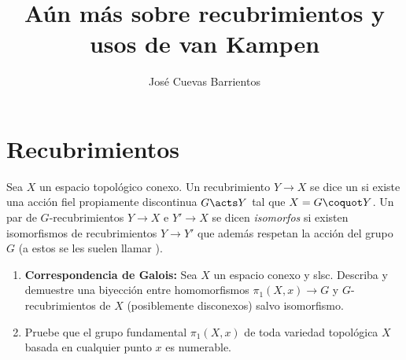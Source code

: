 \documentclass[11pt, reqno]{amsart}
\title{Aún más sobre recubrimientos y usos de van Kampen}
\date{\DTMdate{2026-10-29}}
\author{José Cuevas Barrientos}
\begin{document}
\maketitle

\section{Recubrimientos}
Sea $X$ un espacio topológico conexo.
Un recubrimiento $Y \to X$ se dice un  si existe una acción fiel propiamente discontinua $G \acts Y$ tal que $X = G \coquot Y$.
Un par de $G$-recubrimientos $Y \to X$ e $Y' \to X$ se dicen \emph{isomorfos} si existen isomorfismos de recubrimientos $Y \to Y'$ que además respetan la
acción del grupo $G$ (a estos se les suelen llamar ).

\begin{enumerate}
	\item \textbf{Correspondencia de Galois:}
		Sea $X$ un espacio conexo y slsc.
		Describa y demuestre una biyección entre homomorfismos $\pi_1(X, x) \to G$ y $G$-recubrimientos de $X$ (posiblemente disconexos) salvo isomorfismo.

	\item Pruebe que el grupo fundamental $\pi_1(X, x)$ de toda variedad topológica $X$ basada en cualquier punto $x$ es numerable.
\end{enumerate}
\end{document}
